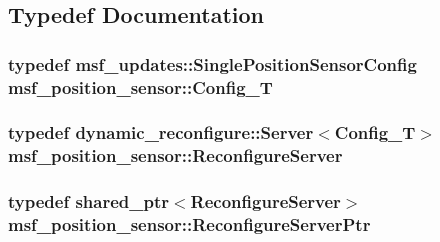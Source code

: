 \subsection{Typedef Documentation}
\hypertarget{namespacemsf__position__sensor_a888f7a67abc78bbe9b927b35f1e05933}{
\subsubsection[{Config\-\_\-\-T}]{\setlength{\rightskip}{0pt plus 5cm}typedef msf\-\_\-updates\-::\-Single\-Position\-Sensor\-Config {\bf msf\-\_\-position\-\_\-sensor\-::\-Config\-\_\-\-T}}}\label{namespacemsf__position__sensor_a888f7a67abc78bbe9b927b35f1e05933}
\hypertarget{namespacemsf__position__sensor_a481ab70c52d45ad3c2cef969e1d959ca}{
\subsubsection[{Reconfigure\-Server}]{\setlength{\rightskip}{0pt plus 5cm}typedef dynamic\-\_\-reconfigure\-::\-Server$<${\bf Config\-\_\-\-T}$>$ {\bf msf\-\_\-position\-\_\-sensor\-::\-Reconfigure\-Server}}}\label{namespacemsf__position__sensor_a481ab70c52d45ad3c2cef969e1d959ca}
\hypertarget{namespacemsf__position__sensor_a62920eb4890a10e8224aa5ef62bb56a2}{
\subsubsection[{Reconfigure\-Server\-Ptr}]{\setlength{\rightskip}{0pt plus 5cm}typedef shared\-\_\-ptr$<${\bf Reconfigure\-Server}$>$ {\bf msf\-\_\-position\-\_\-sensor\-::\-Reconfigure\-Server\-Ptr}}}\label{namespacemsf__position__sensor_a62920eb4890a10e8224aa5ef62bb56a2}

